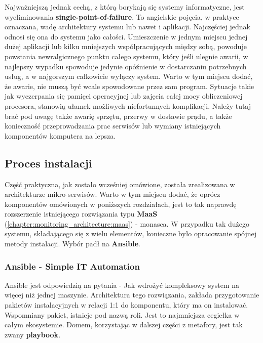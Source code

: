 Najważniejszą jednak cechą, z którą borykają się systemy informatyczne, jest wyeliminowania \textbf{single-point-of-failure}.
To angielskie pojęcia, w praktyce oznaczana, wadę architektury systemu lub nawet i aplikacji. Najczęściej jednak odnosi się
ona do systemu jako całości. Umieszczenie w jednym miejscu jednej dużej aplikacji lub kilku mniejszych współpracujących 
między sobą, powoduje powstania newralgicznego punktu całego systemu, który jeśli ulegnie awarii, w najlepszy wypadku spowoduje
jedynie opóźnienie w dostarczaniu potrzebnych usług, a w najgorszym całkowicie wyłączy system. Warto w tym miejscu dodać, że
awarie, nie muszą być wcale spowodowane przez sam program. Sytuacje takie jak wyczerpania się pamięci operacyjnej lub 
zajęcia całej mocy obliczeniowej procesora, stanowią ułamek możliwych niefortunnych komplikacji. Należy tutaj brać pod uwagę
także awarię sprzętu, przerwy w dostawie prądu, a także konieczność przeprowadzania prac serwisów lub wymiany istniejących
komponentów komputera na lepsza.  

\subsection{Proces instalacji}
\label{chapter:application:architecture:installation}
    Część praktyczna, jak zostało wcześniej omówione, została zrealizowana w architekturze mikro-serwisów. Warto w tym miejscu dodać,
    że oprócz komponentów omówionych w poniższych rozdziałach, jest to tak naprawdę rozszerzenie istniejącego rozwiązania typu \textbf{MaaS}
    (\ref{chapter:monitoring_architecture:maas}) - monasca. W przypadku tak dużego systemu, składającego się z wielu elementów, 
    konieczne było opracowanie spójnej metody instalacji. Wybór padł na \textbf{Ansible}. 
    
    \subsubsection{Ansible - Simple IT Automation}
    \label{chapter:application:architecture:installation:ansible}
    Ansible jest odpowiedzią na pytania - Jak wdrożyć kompleksowy system na więcej niż jednej maszynie. Architektura tego rozwiązania,
    zakłada przygotowanie pakietów instalacyjnych w relacji 1:1 do komponentu, który ma on instalować. Wspomniany pakiet, istnieje pod nazwą roli.
    Jest to najmniejsza cegiełka w całym ekosystemie. Domem, korzystając w dalszej części z metafory, jest tak zwany \textbf{playbook}.
    
